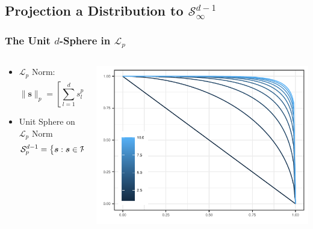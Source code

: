 \documentclass[aspectratio=169]{beamer}
\begin{document}
\subsection{Projection a Distribution to $\mathcal{S}_{\infty}^{d-1}$}

\begin{frame}
  \frametitle{The Unit $d$-Sphere in $\mathcal{L}_p$}
  \begin{columns}
    \begin{column}{.38\textwidth}
      \begin{itemize}
        \item $\mathcal{L}_p$ Norm:
          \begin{equation*}
            \lVert \bm{s}\rVert_p = \left[\sum_{l = 1}^ds_l^p\right]^{\frac{1}{p}}
          \end{equation*}
        \pause
        \item Unit Sphere on $\mathcal{L}_p$ Norm
          \begin{equation*}
            \mathcal{S}_{p}^{d-1} = \left\lbrace \bm{s} : 
                \bm{s}\in\mathcal{R}_+^d,\hspace{.2cm} \lVert\bm{s}\rVert_p = 1 \right\rbrace
          \end{equation*}
      \end{itemize}%
      \vfill
      ~
    \end{column}%
    \hfill%
    \begin{column}{.58\textwidth}
      \begin{center}
        \includegraphics[width = .8\linewidth, height = .8\linewidth]{./images/p_sphere}
      \end{center}
    \end{column}%
  \end{columns}%
\end{frame} %
\end{document}
